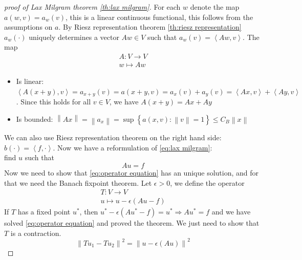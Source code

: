 \documentclass[../Main/main.tex]{subfiles}
\begin{document}
	\begin{proof}[proof of Lax Milgram theorem \ref{th:lax milgram}]
		For each $w$ denote the map $a(w,v) = a_w(v)$, this is a linear continuous functional, this follows from the assumptions on $a$. By Riesz representation theorem \ref{th:riesz representation} $a_w(\cdot)$ uniquely determines a vector $Aw \in V$ such that $a_w(v) = \left \langle Aw,v \right \rangle$. The map
		\begin{equation*}
			\begin{gathered}
				A:V\rightarrow V \\
				w \mapsto Aw
			\end{gathered}
		\end{equation*}
		\begin{itemize}
			\item 		Is linear: $\left \langle A(x+y),v  \right \rangle = a_{x+y}(v) = a(x+y,v) = a_x(v)+a_y(v) = \left \langle Ax,v \right \rangle+\left \langle Ay,v \right \rangle$. Since this holds for all $v \in V$, we have $A(x+y)=Ax + Ay$
			\item Is bounded: $\left \| Ax \right \|=\left \| a_x \right \| = \sup \left \{ a(x,v):\left \| v \right \|=1 \right \} \leq C_B \left \| x \right \|$
		\end{itemize}
		We can also use Riesz representation theorem on the right hand side: $b(\cdot)=\left \langle f,\cdot \right \rangle$. Now we have a reformulation of \eqref{eq:lax milgram}:\\
		find $u$ such that
		\begin{equation}\label{eq:operator equation}
			Au = f
		\end{equation}
		Now we need to show that \eqref{eq:operator equation} has an unique solution, and for that we need the Banach fixpoint theorem. Let $\epsilon > 0$, we define the operator 
		\begin{equation*}
			\begin{aligned}
				T:V \rightarrow V \\
				u \mapsto u-\epsilon (Au-f)
			\end{aligned}
		\end{equation*}
		If $T$ has a fixed point $u^*$, then $u^*-\epsilon(Au^*-f)=u^* \Rightarrow Au^* =f$ and we have solved \eqref{eq:operator equation} and proved the theorem. We just need to show that $T$ is a contraction.
		\begin{equation*}
			\left \| Tu_1 - Tu_2 \right \|^2 = \left \| u-\epsilon(Au) \right \|^2 
		\end{equation*}

\end{proof}
\end{document}
